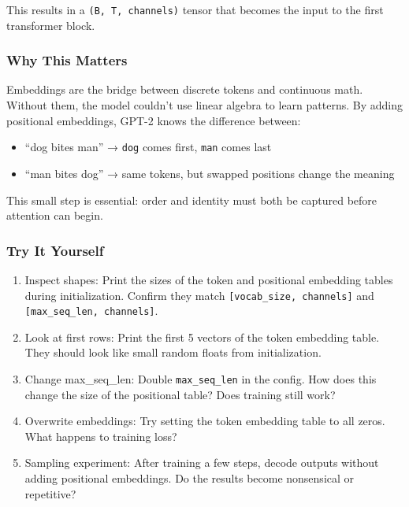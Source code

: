\documentclass[
  letterpaper,
  DIV=11,
  numbers=noendperiod]{scrreprt}
\providecommand{\tightlist}{%
  \setlength{\itemsep}{0pt}\setlength{\parskip}{0pt}}
\begin{document}
This results in a \texttt{(B,\ T,\ channels)} tensor that becomes the
input to the first transformer block.

\subsubsection{Why This Matters}\label{why-this-matters-1}

Embeddings are the bridge between discrete tokens and continuous math.
Without them, the model couldn't use linear algebra to learn patterns.
By adding positional embeddings, GPT-2 knows the difference between:

\begin{itemize}
\tightlist
\item
  ``dog bites man'' → \texttt{dog} comes first, \texttt{man} comes last
\item
  ``man bites dog'' → same tokens, but swapped positions change the
  meaning
\end{itemize}

This small step is essential: order and identity must both be captured
before attention can begin.

\subsubsection{Try It Yourself}\label{try-it-yourself-12}

\begin{enumerate}
\def\labelenumi{\arabic{enumi}.}
\tightlist
\item
  Inspect shapes: Print the sizes of the token and positional embedding
  tables during initialization. Confirm they match
  \texttt{{[}vocab\_size,\ channels{]}} and
  \texttt{{[}max\_seq\_len,\ channels{]}}.
\item
  Look at first rows: Print the first 5 vectors of the token embedding
  table. They should look like small random floats from initialization.
\item
  Change max\_seq\_len: Double \texttt{max\_seq\_len} in the config. How
  does this change the size of the positional table? Does training still
  work?
\item
  Overwrite embeddings: Try setting the token embedding table to all
  zeros. What happens to training loss?
\item
  Sampling experiment: After training a few steps, decode outputs
  without adding positional embeddings. Do the results become
  nonsensical or repetitive?
\end{enumerate}
\end{document}
